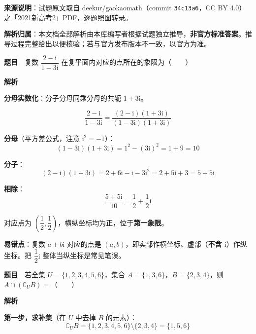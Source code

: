 

\begin{gknotice}
\textbf{来源说明}：试题原文取自 deekur/gaokaomath（commit \texttt{34c13a6}，CC BY 4.0）之「2021新高考2」PDF，逐题照图转录。

\textbf{解析归属}：本文档全部解析由本库编写者根据试题独立推导，\textbf{非官方标准答案}。推导过程完整给出以便核验；若与官方发布版本不一致，以官方为准。
\end{gknotice}

\par\medskip



\textbf{题目}　复数 $\dfrac{2-\mathrm i}{1-3\mathrm i}$ 在复平面内对应的点所在的象限为（　　）

\textbf{解析}

\textbf{分母实数化}：分子分母同乘分母的共轭 $1+3\mathrm i$。

\[\frac{2-\mathrm i}{1-3\mathrm i}=\frac{(2-\mathrm i)(1+3\mathrm i)}{(1-3\mathrm i)(1+3\mathrm i)}\]

\textbf{分母}（平方差公式，注意 $\mathrm i^{2}=-1$）：
\[(1-3\mathrm i)(1+3\mathrm i)=1^{2}-(3\mathrm i)^{2}=1+9=10\]

\textbf{分子}：
\[(2-\mathrm i)(1+3\mathrm i)=2+6\mathrm i-\mathrm i-3\mathrm i^{2}=2+5\mathrm i+3=5+5\mathrm i\]

\textbf{相除}：
\[\frac{5+5\mathrm i}{10}=\frac12+\frac12\mathrm i\]

对应点为 $\left(\dfrac12,\dfrac12\right)$，横纵坐标均为正，位于\textbf{第一象限}。


\begin{gktip}
\textbf{易错点}：复数 $a+b\mathrm i$ 对应的点是 $(a,b)$，即实部作横坐标、虚部（\textbf{不含 $\mathrm i$}）作纵坐标。把 $\dfrac12\mathrm i$ 整体当纵坐标是常见笔误。
\end{gktip}

\par\medskip


\textbf{题目}　若全集 $U=\{1,2,3,4,5,6\}$，集合 $A=\{1,3,6\}$，$B=\{2,3,4\}$，则 $A\cap\left(\complement_U B\right)=$（　　）

\textbf{解析}

\textbf{第一步，求补集}（在 $U$ 中去掉 $B$ 的元素）：
\[\complement_U B=\{1,2,3,4,5,6\}\setminus\{2,3,4\}=\{1,5,6\}\]

